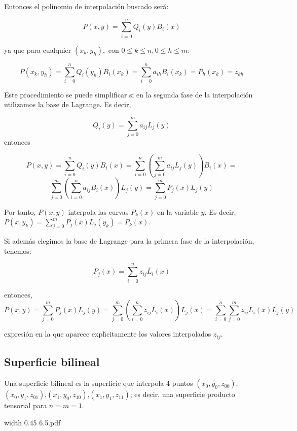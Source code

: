 \documentclass[twoside]{report}
\newcommand{\colocapdf}[2]{\quad\pdfimage width #2 {#1.pdf}}
\begin{document}
Entonces el polinomio de interpolaci\'{o}n buscado ser\'{a}:

$$P(x,y)=\sum_{i=0}^n Q_i(y) B_i(x)$$

ya que para cualquier $(x_k,y_h),$ con $0\leq k\leq n, 0\leq h\leq m$:

$$P(x_k,y_h)=\sum_{i=0}^n Q_i(y_h)B_i(x_k)=\sum_{i=0}^n a_{ih} B_i(x_k)=P_h(x_k)=z_{kh}$$

%

Este procedimiento se puede simplificar si en la segunda fase de la interpolaci\'{o}n utilizamos la base de Lagrange. Es decir,

$$Q_i(y)=\sum_{j=0}^m a_{ij} L_j(y)$$
entonces

$$P(x,y)=\sum_{i=0}^n Q_i(y) B_i(x)=\sum_{i=0}^n \left( \sum_{j=0}^m a_{ij} L_j(y)\right) B_i(x)=$$ $$\sum_{j=0}^m \left( \sum_{i=0}^n a_{ij} B_i(x)\right) L_j(y)= \sum_{j=0}^m P_j(x)L_j(y)$$

Por tanto, $P(x,y)$ interpola las curvas $P_k(x)$ en la variable $y$. Es decir, $P(x,y_k)=\sum_{j=0}^m P_j(x)L_j(y_k)= P_k(x)$.

Si adem\'{a}s elegimos la base de Lagrange para la primera fase de la interpolaci\'{o}n, tenemos:

$$P_j(x)=\sum_{i=0}^n z_{ij} \overline{L}_i(x)$$

entonces,
$$P(x,y)=\sum_{j=0}^m P_j(x) L_j(y)=\sum_{j=0}^m \left( \sum_{i=0}^n z_{ij} \overline{L}_i(x)\right) L_j(x)=\sum_{i=0}^n \sum_{j=0}^m z_{ij} \overline{L}_i(x) L_j(y)$$

expresi\'{o}n en la que aparece expl\'{\i}citamente los valores interpolados $z_{ij}$.

\subsection{Superficie bilineal}

\begin{df}
Una superficie bilineal es la superficie que interpola $4$ puntos $(x_0,y_0,z_{00})$,\;$(x_0,y_1,z_{01})$,\;$(x_1,y_0,z_{10})$,\;$(x_1,y_1,z_{11})$; es decir, una superficie producto tensorial para $n=m=1$.
\end{df}

\begin{center}
\colocapdf{6.5}{0.45\textwidth}
\end{center}
\end{document}
